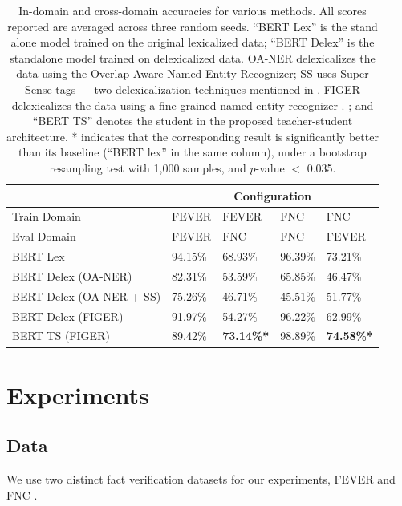 \begin{table}[h!]
\begin{center}
\footnotesize
\begin{tabular}{p{40mm}p{9mm}p{9mm}p{9mm}p{9mm}}
\toprule
& \multicolumn{4}{c}{Configuration} \\
\midrule
Train Domain & {FEVER}&{FEVER}&{FNC}&{{FNC}} \\
Eval Domain & {FEVER}&{{FNC}}&{FNC}&{{FEVER}} \\
\midrule
BERT Lex&94.15\%&68.93\%&96.39\%&73.21\%\\
BERT Delex (OA-NER)&82.31\%&53.59\%&65.85\%&46.47\%\\
BERT Delex (OA-NER + SS)&75.26\%&46.71\%&45.51\%&51.77\%\\
BERT Delex (FIGER)&91.97\%&54.27\%&96.22\%&62.99\%\\
BERT TS (FIGER)&89.42\%&\textbf{73.14\%*}&98.89\%&\textbf{74.58\%*}\\
\bottomrule
\end{tabular}
\end{center}
\caption{\label{crossdomain} In-domain and cross-domain accuracies for various methods. All scores reported are averaged across three random seeds. ``BERT Lex'' is the stand alone model trained on the original lexicalized data; ``BERT Delex'' is the standalone model trained on delexicalized data. OA-NER delexicalizes the data using the Overlap Aware Named Entity Recognizer; SS uses Super Sense tags --- two  delexicalization techniques mentioned in \citet{suntwal-etal-2019-importance}. FIGER delexicalizes the data using a fine-grained named entity recognizer \citep{ling2012fine}. ; and ``BERT TS'' denotes the student in the proposed teacher-student architecture. * indicates that the corresponding result is significantly better than its baseline (``BERT lex'' in the same column), under a bootstrap resampling test with 1,000 samples, and $p$-value $<$ 0.035.
}
\label{results_fnc}

\end{table}

\section{Experiments}

\subsection{Data}

We use two distinct fact verification datasets for
our experiments, FEVER \citep{thorne-etal-2018-fact} and FNC \citep{pomerleau2017fake}.

